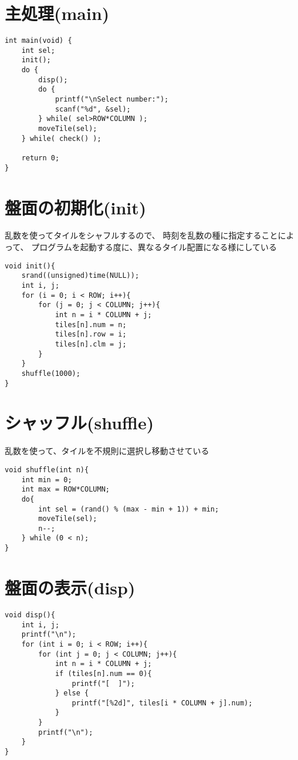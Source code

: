 \documentclass[uplatex,a4paper,11pt,oneside,openany]{jsbook}
\begin{document}
\section{主処理(main)}

\begin{lstlisting}
int main(void) {
    int sel;
    init();
    do {
        disp();
        do {
            printf("\nSelect number:");
            scanf("%d", &sel);
        } while( sel>ROW*COLUMN );
        moveTile(sel);
    } while( check() );

    return 0;
}
\end{lstlisting}

\section{盤面の初期化(init)}

乱数を使ってタイルをシャフルするので、
時刻を乱数の種に指定することによって、
プログラムを起動する度に、異なるタイル配置になる様にしている

\begin{lstlisting}
void init(){
    srand((unsigned)time(NULL));
    int i, j;
    for (i = 0; i < ROW; i++){
        for (j = 0; j < COLUMN; j++){
            int n = i * COLUMN + j;
            tiles[n].num = n;
            tiles[n].row = i;
            tiles[n].clm = j;
        }
    }
    shuffle(1000);
}
\end{lstlisting}

\section{シャッフル(shuffle)}

乱数を使って、タイルを不規則に選択し移動させている

\begin{lstlisting}
void shuffle(int n){
    int min = 0;
    int max = ROW*COLUMN;
    do{
        int sel = (rand() % (max - min + 1)) + min;
        moveTile(sel);
        n--;
    } while (0 < n);
}
\end{lstlisting}

\newpage

\section{盤面の表示(disp)}

\begin{lstlisting}
void disp(){
    int i, j;
    printf("\n");
    for (int i = 0; i < ROW; i++){
        for (int j = 0; j < COLUMN; j++){
            int n = i * COLUMN + j;
            if (tiles[n].num == 0){
                printf("[  ]");
            } else {
                printf("[%2d]", tiles[i * COLUMN + j].num);
            }
        }
        printf("\n");
    }
}
\end{lstlisting}
\end{document}
